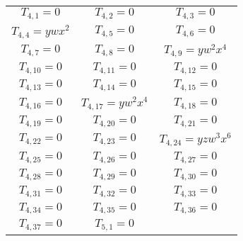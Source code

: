 \begin{longtable}{|c|c|c|}
$T_{4,1}= 0$&

$T_{4,2}= 0$&

$T_{4,3}= 0$\\

$T_{4,4}= ywx^2$&

$T_{4,5}= 0$&

$T_{4,6}= 0$\\

$T_{4,7}= 0$&

$T_{4,8}= 0$&

$T_{4,9}= yw^2x^4$\\

$T_{4,10}= 0$&

$T_{4,11}= 0$&

$T_{4,12}= 0$\\

$T_{4,13}= 0$&

$T_{4,14}= 0$&

$T_{4,15}= 0$\\

$T_{4,16}= 0$&

$T_{4,17}= yw^2x^4$&

$T_{4,18}= 0$\\

$T_{4,19}= 0$&

$T_{4,20}= 0$&

$T_{4,21}= 0$\\

$T_{4,22}= 0$&

$T_{4,23}= 0$&

$T_{4,24}= yzw^3x^6$\\

$T_{4,25}= 0$&

$T_{4,26}= 0$&

$T_{4,27}= 0$\\

$T_{4,28}= 0$&

$T_{4,29}= 0$&

$T_{4,30}= 0$\\

$T_{4,31}= 0$&

$T_{4,32}= 0$&

$T_{4,33}= 0$\\

$T_{4,34}= 0$&

$T_{4,35}= 0$&

$T_{4,36}= 0$\\

$T_{4,37}= 0$&

$T_{5,1}= 0$&


\end{longtable}
